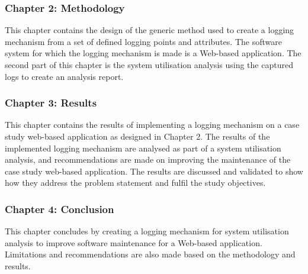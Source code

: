 \subsubsection{Chapter 2: Methodology}
This chapter contains the design of the generic method used to create a logging mechanism from a set of defined logging points and attributes. The software system for which the logging mechanism is made is a Web-based application. The second part of this chapter is the system utilisation analysis using the captured logs to create an analysis report.

\subsubsection{Chapter 3: Results}
This chapter contains the results of implementing a logging mechanism on a case study web-based application as designed in Chapter 2. The results of the implemented logging mechanism are analysed as part of a system utilisation analysis, and recommendations are made on improving the maintenance of the case study web-based application. The results are discussed and validated to show how they address the problem statement and fulfil the study objectives.

\subsubsection{Chapter 4: Conclusion}
This chapter concludes by creating a logging mechanism for system utilisation analysis to improve software maintenance for a Web-based application. Limitations and recommendations are also made based on the methodology and results.
